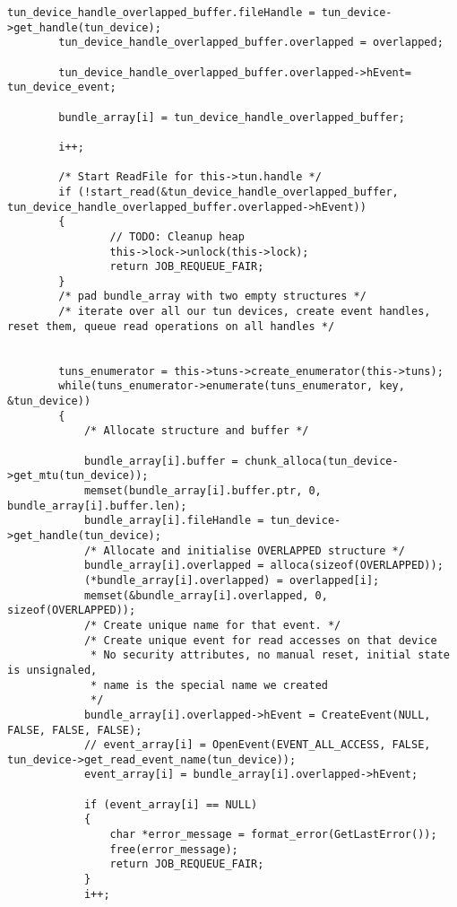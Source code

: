 \begin{lstlisting}[caption=Code für handle\_plain auf Windows,label=lst:handle-plain-windows]
        tun_device_handle_overlapped_buffer.fileHandle = tun_device->get_handle(tun_device);
        tun_device_handle_overlapped_buffer.overlapped = overlapped;

        tun_device_handle_overlapped_buffer.overlapped->hEvent= tun_device_event;

        bundle_array[i] = tun_device_handle_overlapped_buffer;

        i++;

        /* Start ReadFile for this->tun.handle */
        if (!start_read(&tun_device_handle_overlapped_buffer, tun_device_handle_overlapped_buffer.overlapped->hEvent))
        {
                // TODO: Cleanup heap
                this->lock->unlock(this->lock);
                return JOB_REQUEUE_FAIR;
        }
        /* pad bundle_array with two empty structures */
        /* iterate over all our tun devices, create event handles, reset them, queue read operations on all handles */


        tuns_enumerator = this->tuns->create_enumerator(this->tuns);
        while(tuns_enumerator->enumerate(tuns_enumerator, key, &tun_device))
        {
            /* Allocate structure and buffer */

            bundle_array[i].buffer = chunk_alloca(tun_device->get_mtu(tun_device));
            memset(bundle_array[i].buffer.ptr, 0, bundle_array[i].buffer.len);
            bundle_array[i].fileHandle = tun_device->get_handle(tun_device);
            /* Allocate and initialise OVERLAPPED structure */
            bundle_array[i].overlapped = alloca(sizeof(OVERLAPPED));
            (*bundle_array[i].overlapped) = overlapped[i];
            memset(&bundle_array[i].overlapped, 0, sizeof(OVERLAPPED));
            /* Create unique name for that event. */
            /* Create unique event for read accesses on that device
             * No security attributes, no manual reset, initial state is unsignaled,
             * name is the special name we created
             */
            bundle_array[i].overlapped->hEvent = CreateEvent(NULL, FALSE, FALSE, FALSE);
            // event_array[i] = OpenEvent(EVENT_ALL_ACCESS, FALSE, tun_device->get_read_event_name(tun_device));
            event_array[i] = bundle_array[i].overlapped->hEvent;

            if (event_array[i] == NULL)
            {
                char *error_message = format_error(GetLastError());
                free(error_message);
                return JOB_REQUEUE_FAIR;
            }
            i++;


\end{lstlisting}
